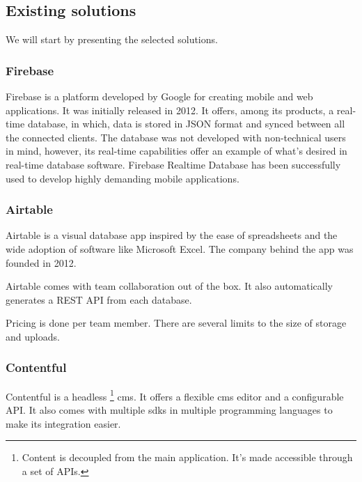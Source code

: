 \subsection{Existing solutions}

We will start by presenting the selected solutions.

\subsubsection{Firebase}


Firebase is a platform developed by Google for creating mobile and web
applications.
It was initially released in 2012.
It offers, among its products, a real-time database, in which, data is stored in JSON format and synced between all the connected clients.
The database was not developed with non-technical users in mind, however, its real-time capabilities offer an example of what's desired in real-time database software.
Firebase Realtime Database has been successfully used to
develop highly demanding mobile applications.

\subsubsection{Airtable}


Airtable is a visual database app inspired by the ease of spreadsheets
and the wide adoption of software like Microsoft Excel.
The company behind the app was founded in 2012.

Airtable comes with team collaboration out of the box. It also
automatically generates a REST API from each database.

Pricing is done per team member.
There are several limits to the size of storage and uploads.

\subsubsection{Contentful}


Contentful is a headless
\footnote{Content is decoupled from the main application.
	It's made accessible through a set of APIs.}
\acrfull{cms}.
It offers a flexible \acrshort{cms} editor and a configurable API.
It also comes with multiple \acrshort{sdk}s in multiple programming languages to make its integration easier.

